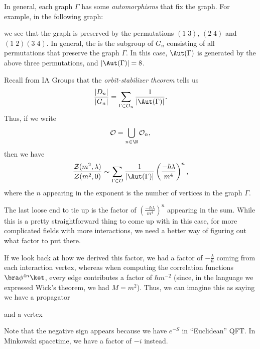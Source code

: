 \documentclass[a4paper]{article}
\begin{document}
In general, each graph $\Gamma$ has some \emph{automorphisms} that fix the graph. For example, in the following graph:
\begin{center}
\end{center}
we see that the graph is preserved by the permutations $(1\; 3)$, $(2\; 4)$ and $(1\; 2)(3\; 4)$. In general, the  \term{$\Aut(\Gamma)$} is the subgroup of $G_n$ consisting of all permutations that preserve the graph $\Gamma$. In this case, $\Aut(\Gamma)$ is generated by the above three permutations, and $|\Aut(\Gamma)| = 8$.

Recall from IA Groups that the \emph{orbit-stabilizer theorem} tells us
\[
  \frac{|D_n|}{|G_n|} = \sum_{\Gamma \in \mathcal{O}_n} \frac{1}{|\Aut(\Gamma)|}.
\]
Thus, if we write
\[
  \mathcal{O} = \bigcup_{n \in \N} \mathcal{O}_n,
\]
then we have
\[
  \frac{\mathcal{Z}(m^2, \lambda)}{\mathcal{Z}(m^2, 0)} \sim \sum_{\Gamma \in \mathcal{O}} \frac{1}{|\Aut(\Gamma)|} \left(\frac{-\hbar \lambda}{m^4}\right)^n,
\]
where the $n$ appearing in the exponent is the number of vertices in the graph $\Gamma$.

The last loose end to tie up is the factor of $\left(\frac{-\hbar \lambda}{m^4}\right)^n$ appearing in the sum. While this is a pretty straightforward thing to come up with in this case, for more complicated fields with more interactions, we need a better way of figuring out what factor to put there.

If we look back at how we derived this factor, we had a factor of $-\frac{\lambda}{\hbar}$ coming from each interaction vertex, whereas when computing the correlation functions $\bra \phi^{4n}\ket$, every edge contributes a factor of $\hbar m^{-2}$ (since, in the language we expressed Wick's theorem, we had $M = m^2$). Thus, we can imagine this as saying we have a propagator
\begin{center}
\end{center}
and a vertex
\begin{center}
\end{center}
Note that the negative sign appears because we have $e^{-S}$ in ``Euclidean'' QFT. In Minkowski spacetime, we have a factor of $-i$ instead.
\end{document}
